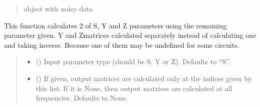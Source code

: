 \documentclass[letterpaper,10pt,english]{sphinxmanual}
\begin{document}
\begin{fulllineitems}
\begin{fulllineitems}
\begin{quote}
\begin{description}
\begin{itemize}
\end{itemize}

\sphinxAtStartPar
object with noisy data

\sphinxAtStartPar
{\hyperref[\detokenize{touchstone:touchstone.spfile}]{}}

\end{description}\end{quote}

\end{fulllineitems}


\begin{fulllineitems}
\label{\detokenize{touchstone:touchstone.spfile.calc_syz}}
\pysigstartsignatures
{}
\pysigstopsignatures
\sphinxAtStartPar
This function calculates 2 of S, Y and Z parameters using the remaining parameter given.
Y and Z\sphinxhyphen{}matrices calculated separately instead of calculating one and taking inverse. Because one of them may be undefined for some circuits.
\begin{quote}\begin{description}
\begin{itemize}
\item {} 
\sphinxAtStartPar
{} (\sphinxstyleliteralemphasis{\sphinxupquote{, }}) \textendash{} Input parameter type (should be S, Y or Z). Defaults to “S”.

\item {} 
\sphinxAtStartPar
{} (\sphinxstyleliteralemphasis{\sphinxupquote{, }}) \textendash{} If given, output matrices are calculated only at the indices given by this list. If it is None, then output matrices are calculated at all frequencies. Defaults to None.

\end{itemize}


\end{description}
\end{quote}
\end{fulllineitems}
\end{fulllineitems}
\end{document}
